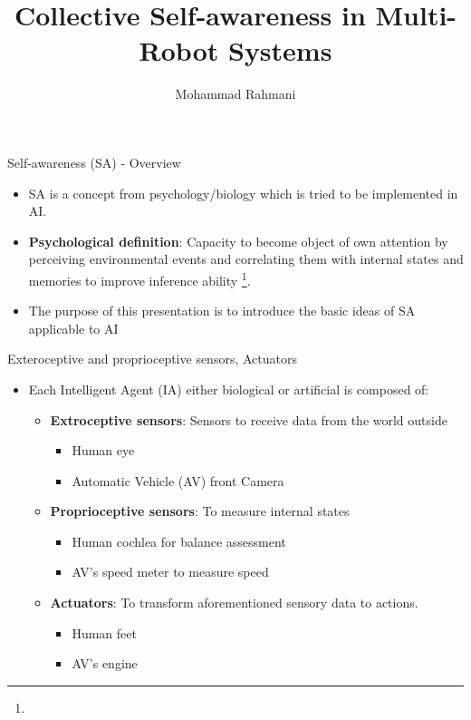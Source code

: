 \documentclass[unknownkeysallowed]{beamer}
\title{Collective Self-awareness in Multi-Robot Systems}
\author{Mohammad Rahmani}
\institute{DECIDE Doctoral School}
\begin{document}
\begin{frame}
	\maketitle
\end{frame}

\begin{frame}{Self-awareness (SA) - Overview}
	\begin{itemize}
		\item SA is a concept from psychology/biology which is tried to be implemented in AI. 
		
		\item \textbf{Psychological definition}: Capacity to become object of own attention by perceiving environmental events and correlating them with internal states and memories to improve inference ability  \footnote{\tiny{}}.
		
		\item The purpose of this presentation is to introduce the basic ideas of SA applicable to AI
	\end{itemize}
\end{frame}


\begin{frame}{Exteroceptive and proprioceptive sensors, Actuators}
	\begin{itemize}
		\item Each Intelligent Agent (IA) either biological or artificial is composed of:
			\begin{itemize}
				\item \textbf{Extroceptive sensors}: Sensors to receive data from the world outside
					\begin{itemize}
						\item Human eye
						\item Automatic Vehicle (AV) front Camera
					\end{itemize}
				\item \textbf{Proprioceptive sensors}: To measure internal states
					\begin{itemize}
						\item Human cochlea for balance assessment
						\item AV's speed meter to measure speed
					\end{itemize}
				\item \textbf{Actuators}: To transform aforementioned sensory data to actions.
					\begin{itemize}
						\item Human feet
						\item AV's engine
					\end{itemize}
			\end{itemize}
	\end{itemize}
\end{frame}
\end{document}
